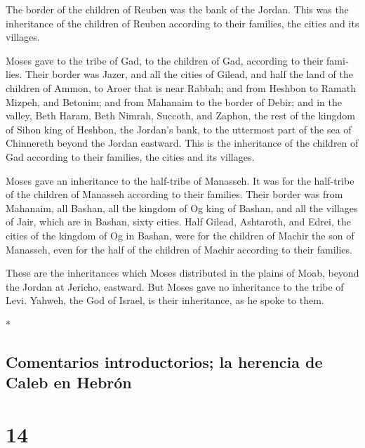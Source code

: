 \begin{paracol}{2}
\begin{otherlanguage}{english}
 The border of the children of Reuben was the bank of the
Jordan. This was the inheritance of the children of Reuben according to
their families, the cities and its villages.

 Moses gave to the tribe of Gad, to the children of Gad,
according to their families.  Their border was Jazer, and
all the cities of Gilead, and half the land of the children of Ammon, to
Aroer that is near Rabbah;  and from Heshbon to Ramath
Mizpeh, and Betonim; and from Mahanaim to the border of Debir;
 and in the valley, Beth Haram, Beth Nimrah, Succoth, and
Zaphon, the rest of the kingdom of Sihon king of Heshbon, the Jordan's
bank, to the uttermost part of the sea of Chinnereth beyond the Jordan
eastward.  This is the inheritance of the children of Gad
according to their families, the cities and its villages.

 Moses gave an inheritance to the half-tribe of Manasseh.
It was for the half-tribe of the children of Manasseh according to their
families.  Their border was from Mahanaim, all Bashan,
all the kingdom of Og king of Bashan, and all the villages of Jair,
which are in Bashan, sixty cities.  Half Gilead,
Ashtaroth, and Edrei, the cities of the kingdom of Og in Bashan, were
for the children of Machir the son of Manasseh, even for the half of the
children of Machir according to their families.

 These are the inheritances which Moses distributed in
the plains of Moab, beyond the Jordan at Jericho, eastward.
 But Moses gave no inheritance to the tribe of Levi.
Yahweh, the God of Israel, is their inheritance, as he spoke to them.

\end{otherlanguage}

\switchcolumn[0]*

\hypertarget{comentarios-introductorios-la-herencia-de-caleb-en-hebruxf3n}{%
\subsection{Comentarios introductorios; la herencia de Caleb en
Hebrón}\label{comentarios-introductorios-la-herencia-de-caleb-en-hebruxf3n}}

\hypertarget{section-26}{%
\section{14}\label{section-26}}


\end{paracol}
